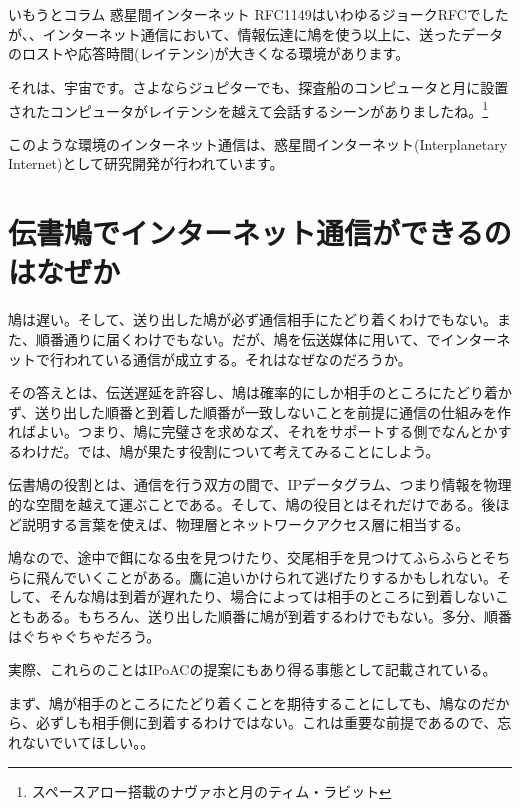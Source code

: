 \section*{}
\begin{itembox}[l]{いもうとコラム 惑星間インターネット}
RFC1149はいわゆるジョークRFCでしたが、、インターネット通信において、情報伝達に鳩を使う以上に、送ったデータのロストや応答時間(レイテンシ)が大きくなる環境があります。

それは、宇宙です。さよならジュピターでも、探査船のコンピュータと月に設置されたコンピュータがレイテンシを越えて会話するシーンがありましたね。\footnote{スペースアロー搭載のナヴァホと月のティム・ラビット}

このような環境のインターネット通信は、惑星間インターネット(Interplanetary Internet)として研究開発が行われています。
\end{itembox}


\section{伝書鳩でインターネット通信ができるのはなぜか}
鳩は遅い。そして、送り出した鳩が必ず通信相手にたどり着くわけでもない。また、順番通りに届くわけでもない。だが、鳩を伝送媒体に用いて、でインターネットで行われている通信が成立する。それはなぜなのだろうか。

その答えとは、伝送遅延を許容し、鳩は確率的にしか相手のところにたどり着かず、送り出した順番と到着した順番が一致しないことを前提に通信の仕組みを作ればよい。つまり、鳩に完璧さを求めなズ、それをサポートする側でなんとかするわけだ。では、鳩が果たす役割について考えてみることにしよう。

伝書鳩の役割とは、通信を行う双方の間で、IPデータグラム、つまり情報を物理的な空間を越えて運ぶことである。そして、鳩の役目とはそれだけである。後ほど説明する言葉を使えば、物理層とネットワークアクセス層に相当する。

鳩なので、途中で餌になる虫を見つけたり、交尾相手を見つけてふらふらとそちらに飛んでいくことがある。鷹に追いかけられて逃げたりするかもしれない。そして、そんな鳩は到着が遅れたり、場合によっては相手のところに到着しないこともある。もちろん、送り出した順番に鳩が到着するわけでもない。多分、順番はぐちゃぐちゃだろう。

実際、これらのことはIPoACの提案にもあり得る事態として記載されている。

まず、鳩が相手のところにたどり着くことを期待することにしても、鳩なのだから、必ずしも相手側に到着するわけではない。これは重要な前提であるので、忘れないでいてほしい。。



